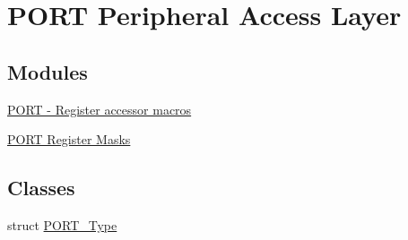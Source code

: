 \hypertarget{group__PORT__Peripheral__Access__Layer}{}\section{P\+O\+RT Peripheral Access Layer}
\label{group__PORT__Peripheral__Access__Layer}
\subsection*{Modules}
\begin{DoxyCompactItemize}
\item 
\hyperlink{group__PORT__Register__Accessor__Macros}{P\+O\+R\+T -\/ Register accessor macros}
\item 
\hyperlink{group__PORT__Register__Masks}{P\+O\+R\+T Register Masks}
\end{DoxyCompactItemize}
\subsection*{Classes}
\begin{DoxyCompactItemize}
\item 
struct \hyperlink{structPORT__Type}{P\+O\+R\+T\+\_\+\+Type}
\end{DoxyCompactItemize}

